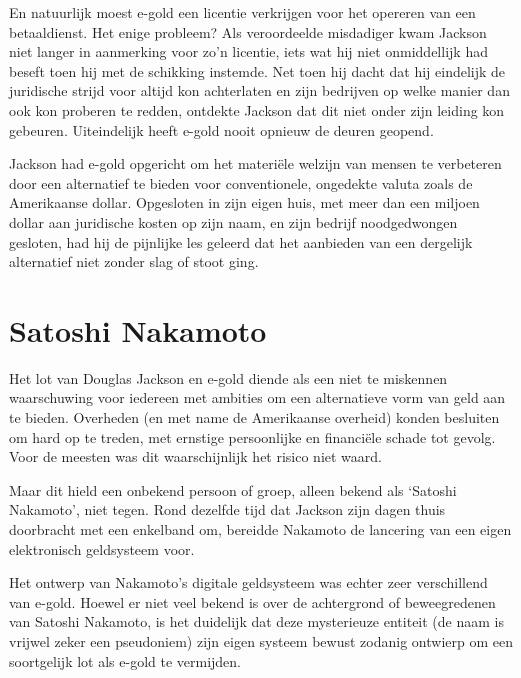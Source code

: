 \documentclass[
  a5paper,
  smalldemyvopaper,11pt,twoside,onecolumn,openright,extrafontsizes,
hidelinks]{memoir}
\begin{document}
En natuurlijk moest e-gold een licentie verkrijgen voor het opereren van
een betaaldienst. Het enige probleem? Als veroordeelde misdadiger kwam
Jackson niet langer in aanmerking voor zo'n licentie, iets wat hij niet
onmiddellijk had beseft toen hij met de schikking instemde. Net toen hij
dacht dat hij eindelijk de juridische strijd voor altijd kon achterlaten
en zijn bedrijven op welke manier dan ook kon proberen te redden,
ontdekte Jackson dat dit niet onder zijn leiding kon gebeuren. Uiteindelijk heeft e-gold nooit opnieuw de deuren geopend.

Jackson had e-gold opgericht om het materiële welzijn van mensen te
verbeteren door een alternatief te bieden voor conventionele, ongedekte
valuta zoals de Amerikaanse dollar. Opgesloten in zijn eigen huis, met
meer dan een miljoen dollar aan juridische kosten op zijn naam, en zijn
bedrijf noodgedwongen gesloten, had hij de pijnlijke les geleerd dat het
aanbieden van een dergelijk alternatief niet zonder slag of stoot ging.

\vspace{-2em}

\section*{Satoshi Nakamoto}\label{satoshi-nakamoto}


Het lot van Douglas Jackson en e-gold diende als een niet te miskennen
waarschuwing voor iedereen met ambities om een alternatieve vorm van
geld aan te bieden. Overheden (en met name de Amerikaanse overheid)
konden besluiten om hard op te treden, met ernstige persoonlijke en
financiële schade tot gevolg. Voor de meesten was dit waarschijnlijk het
risico niet waard.

Maar dit hield een onbekend persoon of groep, alleen bekend als `Satoshi
Nakamoto', niet tegen. Rond dezelfde tijd dat Jackson zijn dagen thuis
doorbracht met een enkelband om, bereidde Nakamoto de lancering van een
eigen elektronisch geldsysteem voor.

Het ontwerp van Nakamoto's digitale geldsysteem was echter zeer
verschillend van e-gold. Hoewel er niet veel bekend is over de
achtergrond of beweegredenen van Satoshi Nakamoto, is het duidelijk dat
deze mysterieuze entiteit (de naam is vrijwel zeker een pseudoniem) zijn
eigen systeem bewust zodanig ontwierp om een soortgelijk lot als e-gold
te vermijden.
\end{document}
